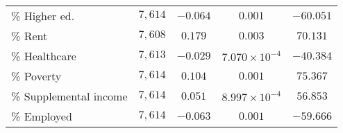 \begin{table}[tbh]
\begin{tabular}{lcccc}
\% Higher ed.           &                                   $7,614$ &                                  $-0.064$ &                                   $0.001$ &                                 $-60.051$ \\
\% Rent                 &                                   $7,608$ &                                   $0.179$ &                                   $0.003$ &                                  $70.131$ \\
\% Healthcare           &                                   $7,613$ &                                  $-0.029$ &                    $7.070 \times 10^{-4}$ &                                 $-40.384$ \\
\% Poverty              &                                   $7,614$ &                                   $0.104$ &                                   $0.001$ &                                  $75.367$ \\
\% Supplemental income  &                                   $7,614$ &                                   $0.051$ &                    $8.997 \times 10^{-4}$ &                                  $56.853$ \\
\% Employed             &                                   $7,614$ &                                  $-0.063$ &                                   $0.001$ &                                 $-59.666$ \\
\bottomrule
\end{tabular}

        \end{table}